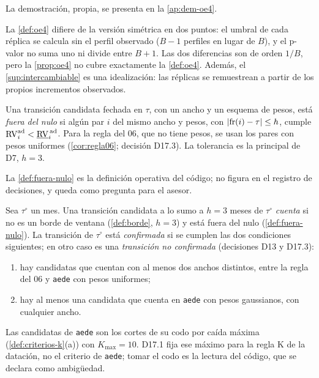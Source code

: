 La demostración, propia, se presenta en la \cref{ap:dem-oe4}.

\begin{observacion}\label{obs:oe4}
La \cref{def:oe4} difiere de la versión simétrica en dos puntos: el umbral de cada réplica se
calcula sin el perfil observado ($B-1$ perfiles en lugar de $B$), y el p-valor no suma uno ni
divide entre $B+1$. Las dos diferencias son de orden $1/B$, pero la \cref{prop:oe4} no cubre
exactamente la \cref{def:oe4}. Además, el \cref{sup:intercambiable} es una idealización: las
réplicas se remuestrean a partir de los propios incrementos observados.
\end{observacion}

\begin{definicion}\label{def:fuera-nulo}
Una transición candidata fechada en $\tau$, con un ancho y un esquema de pesos, está \emph{fuera del
nulo} si algún par $i$ del mismo ancho y pesos, con $\lvert \operatorname{fr}(i)-\tau\rvert\le h$, cumple
$\operatorname{RV}^{\mathrm{ad}}_{i}<\underline{\operatorname{RV}}^{\,\mathrm{ad}}_{i}$. Para la regla del 06, que no tiene pesos, se usan los pares con pesos
uniformes (\cref{cor:regla06}; decisión D17.3). La tolerancia es la principal de D7, $h=3$.
\end{definicion}

La \cref{def:fuera-nulo} es la definición operativa del código; no figura en el registro de
decisiones, y queda como pregunta para el asesor.

\begin{definicion}\label{def:confirmada}
Sea $\tau^\circ$ un mes. Una transición candidata a lo sumo a $h=3$ meses de $\tau^\circ$ \emph{cuenta} si no es
un borde de ventana (\cref{def:borde}, $h=3$) y está fuera del nulo (\cref{def:fuera-nulo}). La
transición de $\tau^\circ$ está \emph{confirmada} si se cumplen las dos condiciones siguientes; en otro
caso es una \emph{transición no confirmada} (decisiones D13 y D17.3):
\begin{enumerate}[label=(\alph*)]
  \item hay candidatas que cuentan con al menos dos anchos distintos, entre la regla del 06 y
    \texttt{aede} con pesos uniformes;
  \item hay al menos una candidata que cuenta en \texttt{aede} con pesos gaussianos, con cualquier
    ancho.
\end{enumerate}
\end{definicion}

Las candidatas de \texttt{aede} son los cortes de su codo por caída máxima
(\cref{def:criterios-k}(a)) con $K_{\max}=10$. D17.1 fija ese máximo para la regla K de la
datación, no el criterio de \texttt{aede}; tomar el codo es la lectura del código, que se declara
como ambigüedad.

